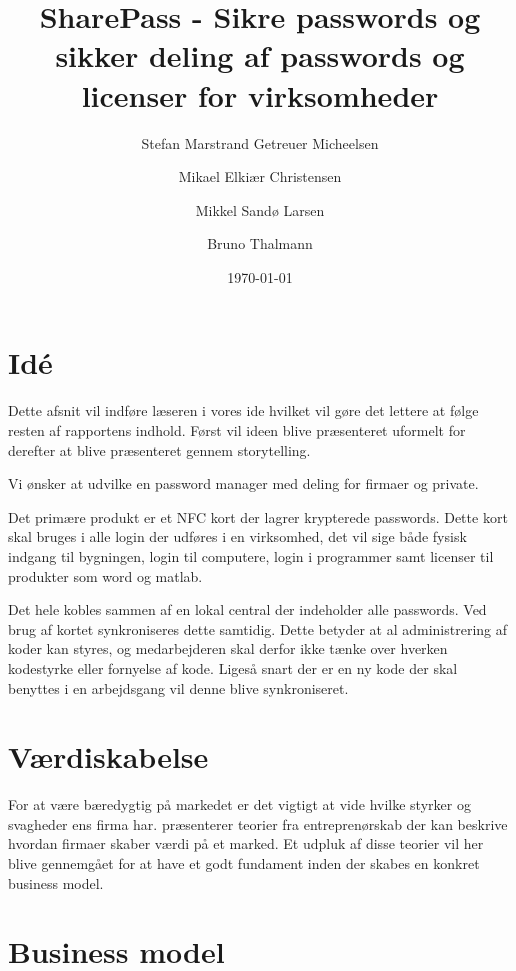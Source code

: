 \documentclass[a4paper]{article}
\title{SharePass - Sikre passwords og sikker deling af passwords og licenser for virksomheder}
\author{Stefan Marstrand Getreuer Micheelsen \and Mikael Elkiær Christensen \and Mikkel Sandø Larsen \and Bruno Thalmann}
\date{\today}
\begin{document}
\maketitle

\section{Idé}
Dette afsnit vil indføre læseren i vores ide hvilket vil gøre det lettere at følge resten af rapportens indhold.
Først vil ideen blive præsenteret uformelt for derefter at blive præsenteret gennem storytelling.

Vi ønsker at udvilke en password manager med deling for firmaer og private.

Det primære produkt er et NFC kort der lagrer krypterede passwords.
Dette kort skal bruges i alle login der udføres i en virksomhed, det vil sige både fysisk indgang til bygningen, login til computere, login i programmer samt licenser til produkter som word og matlab.

Det hele kobles sammen af en lokal central der indeholder alle passwords.
Ved brug af kortet synkroniseres dette samtidig.
Dette betyder at al administrering af koder kan styres, og medarbejderen skal derfor ikke tænke over hverken kodestyrke eller fornyelse af kode.
Ligeså snart der er en ny kode der skal benyttes i en arbejdsgang vil denne blive synkroniseret.



\section{Værdiskabelse}
For at være bæredygtig på markedet er det vigtigt at vide hvilke styrker og svagheder ens firma har.
\citep[p.~11]{rose2012software} præsenterer teorier fra entreprenørskab der kan beskrive hvordan firmaer skaber værdi på et marked.
Et udpluk af disse teorier vil her blive gennemgået for at have et godt fundament inden der skabes en konkret business model.







\section{Business model}




\end{document}

